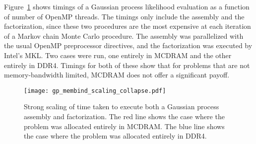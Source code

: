 Figure~\ref{fig:gp} shows timings of a Gaussian process likelihood evaluation
as a function of number of OpenMP threads.  The timings only include the
assembly and the factorization, since these two procedures are the most
expensive at each iteration of a Markov chain Monte Carlo procedure.  The
assembly was parallelized with the usual OpenMP preprocessor directives, and
the factorization was executed by Intel's MKL.  Two cases were run, one
entirely in MCDRAM and the other entirely in DDR4.  Timings for both of these
show that for problems that are not memory-bandwidth limited, MCDRAM does not
offer a significant payoff.

%
%
\begin{figure}
  \begin{center}
    \texttt{[image: gp\_membind\_scaling\_collapse.pdf]}
    \caption{Strong scaling of time taken to execute both a Gaussian process
    assembly and factorization.  The red line shows the case where the problem
    was allocated entirely in MCDRAM.  The blue line shows the case where the
    problem was allocated entirely in DDR4.}
    \label{fig:gp}
  \end{center}
\end{figure}

